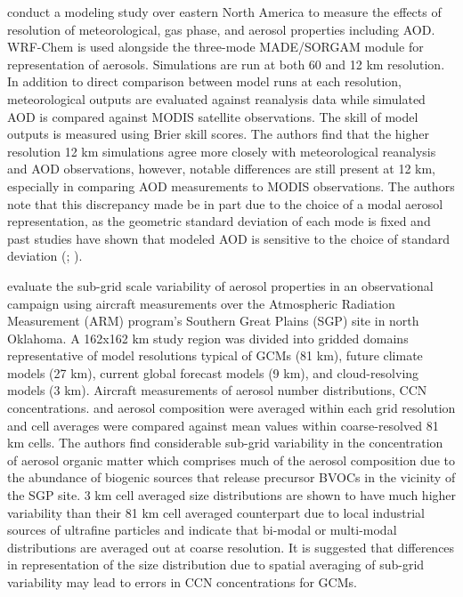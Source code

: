 \cite{crippa_impact_2017} conduct a modeling study over eastern North America to measure the effects of resolution of meteorological, gas phase, and aerosol properties including AOD. WRF-Chem is used alongside the three-mode MADE/SORGAM module for representation of aerosols. Simulations are run at both 60 and 12 km resolution. In addition to direct comparison between model runs at each resolution, meteorological outputs are evaluated against reanalysis data while simulated AOD is compared against MODIS satellite observations. The skill of model outputs is measured using Brier skill scores. The authors find that the higher resolution 12 km simulations agree more closely with meteorological reanalysis and AOD observations, however, notable differences are still present at 12 km, especially in comparing AOD measurements to MODIS observations. The authors note that this discrepancy made be in part due to the choice of a modal aerosol representation, as the geometric standard deviation of each mode is fixed and past studies have shown that modeled AOD is sensitive to the choice of standard deviation (\cite{brock_aerosol_2016}; \cite{mann_intercomparison_2012}). 

\cite{fast_using_2022} evaluate the sub-grid scale variability of aerosol properties in an observational campaign using aircraft measurements over the Atmospheric Radiation Measurement (ARM) program's Southern Great Plains (SGP) site in north Oklahoma. A 162x162 km study region was divided into gridded domains representative of model resolutions typical of GCMs (81 km), future climate models (27 km), current global forecast models (9 km), and cloud-resolving models (3 km). Aircraft measurements of aerosol number distributions, CCN concentrations. and aerosol composition were averaged within each grid resolution and cell averages were compared against mean values within coarse-resolved 81 km cells. The authors find considerable sub-grid variability in the concentration of aerosol organic matter which comprises much of the aerosol composition due to the abundance of biogenic sources that release precursor BVOCs in the vicinity of the SGP site. 3 km cell averaged size distributions are shown to have much higher variability than their 81 km cell averaged counterpart due to local industrial sources of ultrafine particles and indicate that bi-modal or multi-modal distributions are averaged out at coarse resolution. It is suggested that differences in representation of the size distribution due to spatial averaging of sub-grid variability may lead to errors in CCN concentrations for GCMs. 

